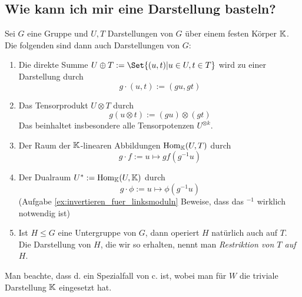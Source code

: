 \subsection{Wie kann ich mir eine Darstellung basteln?}
\begin{lemmadef}
Sei $G$ eine Gruppe und $U,T$ Darstellungen von $G$ über einem festen Körper $\mathbb{K}$. Die folgenden sind dann auch Darstellungen von $G$:
\begin{enumerate}
\item Die direkte Summe $U\oplus T := \Set{(u,t) | u\in U, t\in T}$ wird zu einer Darstellung durch
\[g\cdot(u,t) := (gu,gt)\]
\item Das Tensorprodukt $U\otimes T$ durch
\[g(u\otimes t) := (gu)\otimes (gt)\]
Das beinhaltet insbesondere alle Tensorpotenzen $U^{\otimes k}$.
\item Der Raum der $\mathbb{K}$-linearen Abbildungen $\operatorname{Hom}_{\mathbb{K}}(U,T)$ durch
\[g\cdot f := u\mapsto gf(g^{-1} u)\]
\item Der Dualraum $U^\ast:= \operatorname{Hom}_{\mathbb{K}}(U,\mathbb{K})$ durch
\[g\cdot \phi := u\mapsto \phi(g^{-1} u)\]
(Aufgabe \ref{ex:invertieren_fuer_linksmoduln} Beweise, dass das $^{-1}$ wirklich notwendig ist)
\item Ist $H\leq G$ eine Untergruppe von $G$, dann operiert $H$ natürlich auch auf $T$. Die Darstellung von $H$, die wir so erhalten, nennt man \emph{Restriktion von $T$ auf $H$}.
\end{enumerate}
\end{lemmadef}

\begin{remark}
Man beachte, dass d. ein Spezialfall von c. ist, wobei man für $W$ die triviale Darstellung $\mathbb{K}$ eingesetzt hat.
\end{remark}

